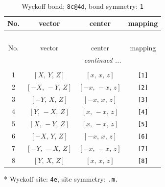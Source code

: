 \documentclass[fleqn,8pt]{jsarticle}
\begin{document}
\renewcommand{\arraystretch}{1.2}
\begin{longtable}{cccc}
\caption{Wyckoff bond: {\tt 8c@4d}, bond symmetry: {\tt 1}}
 \\
 \hline \hline
No. & vector & center & mapping \\ \hline \endfirsthead

\multicolumn{3}{l}{\tablename\ \thetable{}} \\
 \hline \hline
No. & vector & center & mapping \\ \hline \endhead

 \hline \hline
\multicolumn{3}{r}{\footnotesize\it continued ...} \\ \endfoot

 \hline \hline
\multicolumn{3}{r}{} \\ \endlastfoot

1 & $\left[ X,\, Y,\, Z \right]$ & $\left[ x,\, x,\, z \right]$ & {\tt [1]} \\ \hline
2 & $\left[ - X,\, - Y,\, Z \right]$ & $\left[ - x,\, - x,\, z \right]$ & {\tt [2]} \\ \hline
3 & $\left[ - Y,\, X,\, Z \right]$ & $\left[ - x,\, x,\, z \right]$ & {\tt [3]} \\ \hline
4 & $\left[ Y,\, - X,\, Z \right]$ & $\left[ x,\, - x,\, z \right]$ & {\tt [4]} \\ \hline
5 & $\left[ X,\, - Y,\, Z \right]$ & $\left[ x,\, - x,\, z \right]$ & {\tt [5]} \\ \hline
6 & $\left[ - X,\, Y,\, Z \right]$ & $\left[ - x,\, x,\, z \right]$ & {\tt [6]} \\ \hline
7 & $\left[ - Y,\, - X,\, Z \right]$ & $\left[ - x,\, - x,\, z \right]$ & {\tt [7]} \\ \hline
8 & $\left[ Y,\, X,\, Z \right]$ & $\left[ x,\, x,\, z \right]$ & {\tt [8]} \\
\end{longtable}
* Wyckoff site: {\tt 4e}, site symmetry: {\tt .m.}
\renewcommand{\arraystretch}{1.2}
\end{document}
